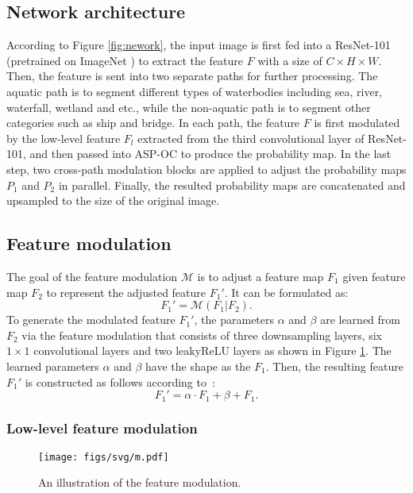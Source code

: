 \documentclass{article}
\begin{document}
\subsection{Network architecture}
According to Figure \ref{fig:nework}, the input image is first fed into a ResNet-101 (pretrained on ImageNet \cite{deng2009imagenet}) to extract the feature $F$ with a size of $C \times H \times W$.
Then, the feature is sent into two separate paths for further processing. 
The aquatic path is to segment different types of waterbodies including sea, river, waterfall, wetland and etc., while the non-aquatic path is to segment other categories such as ship and bridge. 
In each path, the feature $F$ is first modulated by the low-level feature $F_l$ extracted from the third convolutional layer of ResNet-101, and then passed into ASP-OC \cite{YuanW18} to produce the probability map. 
In the last step, two cross-path modulation blocks are applied to adjust the probability maps $P_1$ and $P_2$ in parallel. Finally, the resulted probability maps are concatenated and upsampled to the size of the original image.

\subsection{Feature modulation}
The goal of the feature modulation $\mathcal{M}$ is to adjust a feature map $F_1$ given feature map $F_2$ to represent the adjusted feature $F_1'$. It can be formulated as:
\begin{equation} 
F_1' = \mathcal{M}(F_1| F_2).
\end{equation}
To generate the modulated feature $F_1'$, the parameters $\alpha$ and $\beta$ are learned from $F_2$ via the feature modulation that consists of three downsampling layers, six $1 \times 1$ convolutional layers and two leakyReLU layers as shown in Figure \ref{fig:modulataion}. 
The learned parameters $\alpha$ and $\beta$ have the shape as the $F_1$. Then, the resulting feature $F_1'$ is constructed as follows according to~\cite{wang2018recovering, park2019SPADE}:
\begin{equation} 
F_1' = \alpha \cdot F_1 + \beta + F_1.
\end{equation}

\subsubsection{Low-level feature modulation}

\begin{figure}[htbp]
	\centering
	\texttt{[image: figs/svg/m.pdf]}
	\caption{An illustration of the feature modulation. }
	\label{fig:modulataion}
\end{figure}
\end{document}
